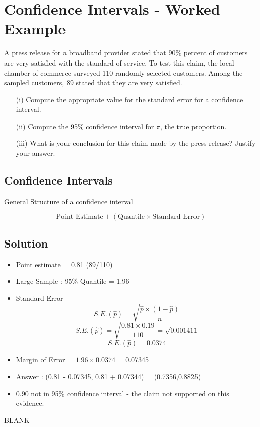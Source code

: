 \documentclass[a4paper,12pt]{article}
\begin{document}
\large 

\section*{Confidence Intervals - Worked Example}
A press release for a broadband provider stated that $90\%$ percent of customers are very satisfied
with the standard of service. To test this claim, the local chamber of commerce surveyed 110 randomly selected customers. Among the sampled customers, 89 stated that they are very satisfied.





\begin{itemize}
\item[(i)]  Compute the appropriate value for the standard error for a confidence interval.
\item[(ii)] Compute the 95\% confidence interval for $\pi$, the true proportion.
\item[(iii)] What is your conclusion for this claim made by the press release? Justify your answer.
\end{itemize}

\subsection*{Confidence Intervals}
General Structure of a confidence interval

\[ \mbox{Point Estimate} \pm \left( \mbox{Quantile} \times \mbox{Standard Error} \right) \]

\subsection*{Solution}

\begin{itemize}
\item Point estimate = 0.81 (89/110)
\item Large Sample : 95\% Quantile = 1.96
\item Standard Error 
\[S.E.(\hat{p}) =  \sqrt{  \frac{\hat{p} \times (1-\hat{p})}{n} }\]
\[S.E.(\hat{p}) = \sqrt{\frac{0.81 \times 0.19}{110}} = \sqrt{0.001411}\]
\[S.E.(\hat{p}) = 0.0374\]
\item Margin of Error = $1.96 \times 0.0374$ = 0.07345
\item Answer : (0.81 - 0.07345, 0.81 + 0.07344) =  (0.7356,0.8825)
\item 0.90 not in 95\% confidence interval - the claim not supported on this evidence. 
\end{itemize}
\newpage
BLANK
\end{document}
